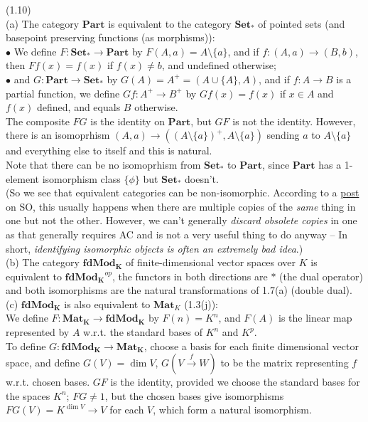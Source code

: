 \documentclass[a4paper]{article}
\begin{document}
\begin{eg} (1.10)\\
    (a) The category $\mathbf{Part}$ is equivalent to the category $\mathbf{Set}_*$ of pointed sets (and basepoint preserving functions (as morphisms)):\\
    $\bullet$ We define $F:\mathbf{Set}_* \to \mathbf{Part}$ by $F(A,a) = A \setminus \{a\}$, and if $f:(A,a) \to (B,b)$, then $Ff(x) = f(x)$ if $f(x) \neq b$, and undefined otherwise;\\
    $\bullet$ and $G: \mathbf{Part} \to \mathbf{Set}_*$ by $G(A) = A^+ = (A \cup \{A\},A)$, and if $f:A \to B$ is a partial function, we define $Gf:A^+ \to B^+$ by $Gf(x) = f(x)$ if $x \in A$ and $f(x)$ defined, and equals $B$ otherwise.\\
    The composite $FG$ is the identity on $\mathbf{Part}$, but $GF$ is not the identity. However, there is an isomoprhism $(A,a) \to ((A \setminus \{a\})^+,A \setminus\{a\})$ sending $a$ to $A \setminus \{a\}$ and everything else to itself and this is natural.\\
    Note that there can be no isomoprhism from $\mathbf{Set}_*$ to $\mathbf{Part}$, since $\mathbf{Part}$ has a 1-element isomorphism class $\{\phi\}$ but $\mathbf{Set}_*$ doesn't.\\
    (So we see that equivalent categories can be non-isomorphic. According to a \href{https://mathoverflow.net/questions/30032/equivalence-versus-isomorphism-of-categories}{post} on SO, this usually happens when there are multiple copies of the \emph{same} thing in one but not the other. However, we can't generally \emph{discard obsolete copies} in one as that generally requires AC and is not a very useful thing to do anyway -- In short, \emph{identifying isomorphic objects is often an extremely bad idea}.)\\
    (b) The category $\mathbf{fdMod_K}$ of finite-dimensional vector spaces over $K$ is equivalent to $\mathbf{fdMod_K}^{op}$, the functors in both directions are $*$ (the dual operator) and both isomorphisms are the natural transformations of 1.7(a) (double dual).\\
    (c) $\mathbf{fdMod_K}$ is also equivalent to $\mathbf{Mat}_K$ (1.3(j)):\\
    We define $F:\mathbf{Mat_K} \to \mathbf{fdMod_K}$ by $F(n) = K^n$, and $F(A)$ is the linear map represented by $A$ w.r.t. the standard bases of $K^n$ and $K^p$.\\
    To define $G:\mathbf{fdMod_K} \to \mathbf{Mat_K}$, choose a basis for each finite dimensional vector space, and define $G(V) = \dim V$, $G(V \xrightarrow{f} W)$ to be the matrix representing $f$ w.r.t. chosen bases. $GF$ is the identity, provided we choose the standard bases for the spaces $K^n$; $FG \neq 1$, but the chosen bases give isomorphisms $FG(V) = K^{\dim V} \to V$ for each $V$, which form a natural isomorphism.
\end{eg}
\end{document}
